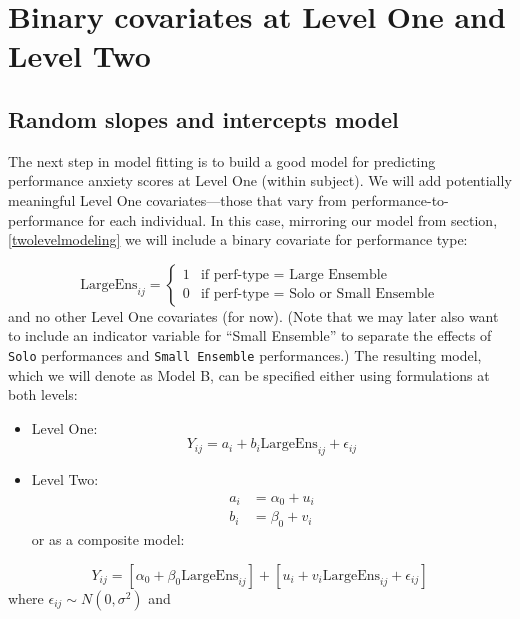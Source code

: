 \documentclass[
]{krantz}
\providecommand{\tightlist}{%
  \setlength{\itemsep}{0pt}\setlength{\parskip}{0pt}}
\begin{document}
\hypertarget{modelb}{%
\section{Binary covariates at Level One and Level Two}\label{modelb}}

\hypertarget{randomslopeandint}{%
\subsection{Random slopes and intercepts model}\label{randomslopeandint}}

The next step in model fitting is to build a good model for predicting performance anxiety scores at Level One (within subject). We will add potentially meaningful Level One covariates---those that vary from performance-to-performance for each individual.  In this case, mirroring our model from section, \ref{twolevelmodeling} we will include a binary covariate for performance type:

\[ \textrm{LargeEns}_{ij} = \begin{cases} 1  & \textrm{if perf-type = Large Ensemble} \\
    0  & \textrm{if perf-type = Solo or Small Ensemble}\end{cases}\]
and no other Level One covariates (for now). (Note that we may later also want to include an indicator variable for ``Small Ensemble'' to separate the effects of \texttt{Solo} performances and \texttt{Small\ Ensemble} performances.) The resulting model, which we will denote as Model B, can be specified either using formulations at both levels:

\begin{itemize}
\tightlist
\item
  Level One:
  \begin{equation*}
  Y_{ij} = a_{i}+b_{i}\textrm{LargeEns}_{ij}+\epsilon_{ij}
  \end{equation*}
\item
  Level Two:
  \begin{align*}
  a_{i} & = \alpha_{0}+u_{i} \\
  b_{i} & = \beta_{0}+v_{i}
  \end{align*}
  or as a composite model:
\end{itemize}

\begin{equation*}
Y_{ij}=[\alpha_{0}+\beta_{0}\textrm{LargeEns}_{ij}]+[u_{i}+v_{i}\textrm{LargeEns}_{ij}+\epsilon_{ij}]
\end{equation*}
where \(\epsilon_{ij}\sim N(0,\sigma^2)\) and
\end{document}
